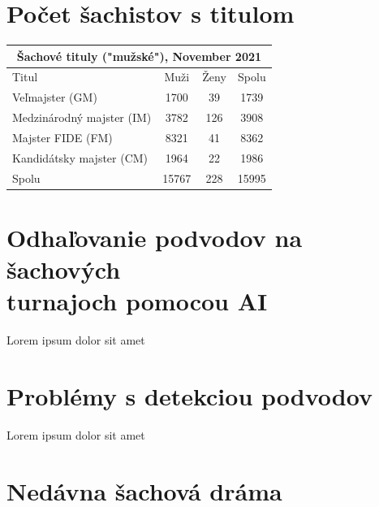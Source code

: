\documentclass[10pt,oneside,slovak,a4paper]{article}
\begin{document}
\section{Počet šachistov s titulom}

\begin{table}[H]
		\def\arraystretch{1.5}
		\begin{tabular}{|lccc|}
			\hline
			\multicolumn{4}{|c|}{Šachové tituly ("mužské"), November 2021}                                                     \\ \hline
			\multicolumn{1}{|l|}{Titul}                       & \multicolumn{1}{c|}{Muži}  & \multicolumn{1}{c|}{Ženy} & Spolu \\ \hline
			\multicolumn{1}{|l|}{Veľmajster (GM)}             & \multicolumn{1}{c|}{1700}  & \multicolumn{1}{c|}{39}   & 1739  \\ \hline
			\multicolumn{1}{|l|}{Medzinárodný   majster (IM)} & \multicolumn{1}{c|}{3782}  & \multicolumn{1}{c|}{126}  & 3908  \\ \hline
			\multicolumn{1}{|l|}{Majster FIDE   (FM)}         & \multicolumn{1}{c|}{8321}  & \multicolumn{1}{c|}{41}   & 8362  \\ \hline
			\multicolumn{1}{|l|}{Kandidátsky   majster (CM)}  & \multicolumn{1}{c|}{1964}  & \multicolumn{1}{c|}{22}   & 1986  \\ \hline
			\multicolumn{1}{|l|}{Spolu}                       & \multicolumn{1}{c|}{15767} & \multicolumn{1}{c|}{228}  & 15995 \\ \hline
		\end{tabular}
\end{table}

\section{Odhaľovanie podvodov na šachových\\
	 turnajoch pomocou AI}

Lorem ipsum dolor sit amet


\section{Problémy s detekciou podvodov}

Lorem ipsum dolor sit amet


\section{Nedávna šachová dráma}
\end{document}
